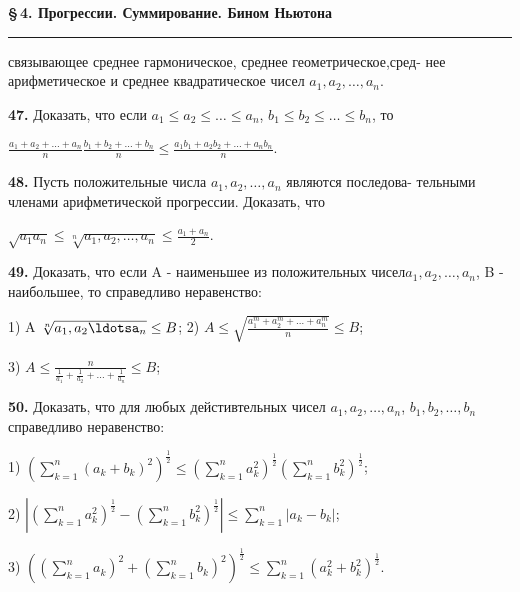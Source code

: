 \documentclass[a5paper, 10pt]{book}
\author{Александр Недосекин}
\date{1.03.2023}
\begin{document}
\setcounter{page}{37}
    
 \begin{center}
         \textbf{\S\,4. Прогрессии. Суммирование. Бином Ньютона}
               \noindent\rule{\textwidth}{1pt}
    \end{center}
\begin{spacing}
     связывающее среднее гармоническое, среднее геометрическое,сред- \per
     нее арифметическое и среднее квадратическое чисел $a_{1}, a_{2}, \ldots, a_{n}$.
    \par \textbf{47. } Доказать, что если $a_{1} \leq a_{2} \leq \ldots \leq a_{n}$, $b_{1} \leq b_{2} \leq \ldots \leq b_{n}$, то
    \begin{center}
        $\frac{a_{1} + a_{2} + \ldots + a_{n}}{n} \frac{b_{1} + b_{2} + \ldots + b_{n}}{n} \leq \frac{a_{1}b_{1} + a_{2}b_{2} + \ldots + a_{n}b_{n}}{n}$.
        \par \textbf{48. } Пусть положительные числа $a_{1},a_{2}, \ldots, a_{n}$ являются последова- \per
        тельными членами арифметической прогрессии. Доказать, что
        \begin{center}
            $\sqrt{a_{1}a_{n}} \leq \sqrt[n]{a_{1},a_{2}, \ldots, a_{n}} \leq \frac{a_{1} + a_{n}}{2}$.
        \end{center}
    \end{center}
    \par \textbf{49. } Доказать, что если A - наименьшее из положительных чисел\per $a_{1},a_{2}, \ldots, a_{n}$, B - наибольшее, то справедливо неравенство:
    \par 1) A \leq $\sqrt[n]{a_{1},a_{2}\ldotsa_{n}} \leq B$;   2) $A \leq \sqrt{\frac{a^m_{1} + a^m_{2} + \ldots + a^m_{n}}{n}} \leq B$;
    \par 3) $A \leq \frac{n}{\frac{1}{a_{1}} + \frac{1}{a_{2}} + \ldots + \frac{1}{a_{n}}} \leq B$;
    \par \textbf{50. } Доказать, что для любых дейстивтельных чисел $a_{1},a_{2}, \ldots, a_{n}$,\per
    $b_{1},b_{2}, \ldots, b_{n}$ справедливо неравенство:
    \par 1) $(\sum\limits_{k=1}^{n}{(a_{k} + b_{k})^2})^{\frac{1}{2}} \leq (\sum\limits_{k=1}^{n}{a^2_{k}})^{\frac{1}{2}} (\sum\limits_{k=1}^{n}{b^2_{k}})^{\frac{1}{2}}$;
    \par 2) $|(\sum\limits_{k=1}^{n}{a^2_{k}})^{\frac{1}{2}} - (\sum\limits_{k=1}^{n}{b^2_{k}})^{\frac{1}{2}}| \leq \sum\limits_{k=1}^{n}{|a_{k} - b_{k}|}$;
    \par 3) $((\sum\limits_{k=1}^{n}{a_{k}})^{2} + (\sum\limits_{k=1}^{n}{b_{k}})^{2})^{\frac{1}{2}} \leq \sum\limits_{k=1}^{n}{(a^2_{k} + b^2_{k})^{\frac{1}{2}}}$.

\end{spacing}
\end{document}
